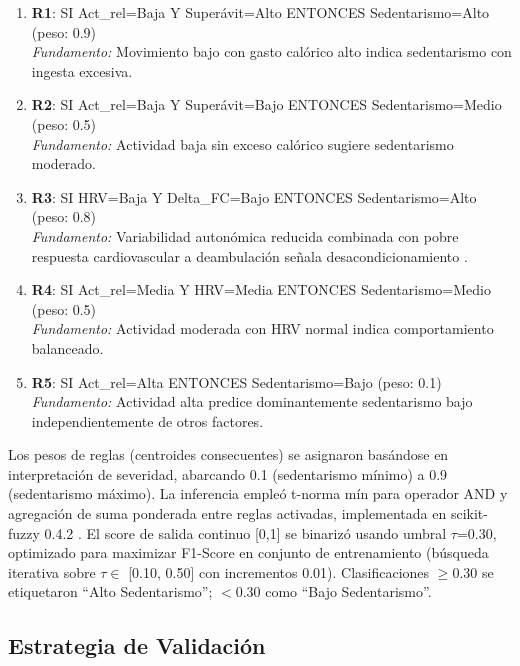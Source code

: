 \documentclass[journal,twoside,web]{ieeecolor}
\begin{document}
\begin{enumerate}
\item \textbf{R1}: SI Act\_rel=Baja Y Superávit=Alto ENTONCES Sedentarismo=Alto (peso: 0.9) \\ \textit{Fundamento:} Movimiento bajo con gasto calórico alto indica sedentarismo con ingesta excesiva.

\item \textbf{R2}: SI Act\_rel=Baja Y Superávit=Bajo ENTONCES Sedentarismo=Medio (peso: 0.5) \\ \textit{Fundamento:} Actividad baja sin exceso calórico sugiere sedentarismo moderado.

\item \textbf{R3}: SI HRV=Baja Y Delta\_FC=Bajo ENTONCES Sedentarismo=Alto (peso: 0.8) \\ \textit{Fundamento:} Variabilidad autonómica reducida combinada con pobre respuesta cardiovascular a deambulación señala desacondicionamiento \cite{Thayer2009,Shaffer2017}.

\item \textbf{R4}: SI Act\_rel=Media Y HRV=Media ENTONCES Sedentarismo=Medio (peso: 0.5) \\ \textit{Fundamento:} Actividad moderada con HRV normal indica comportamiento balanceado.

\item \textbf{R5}: SI Act\_rel=Alta ENTONCES Sedentarismo=Bajo (peso: 0.1) \\ \textit{Fundamento:} Actividad alta predice dominantemente sedentarismo bajo independientemente de otros factores.
\end{enumerate}

Los pesos de reglas (centroides consecuentes) se asignaron basándose en interpretación de severidad, abarcando 0.1 (sedentarismo mínimo) a 0.9 (sedentarismo máximo). La inferencia empleó t-norma mín para operador AND y agregación de suma ponderada entre reglas activadas, implementada en scikit-fuzzy 0.4.2 \cite{Zadeh1965}. El score de salida continuo [0,1] se binarizó usando umbral $\tau$=0.30, optimizado para maximizar F1-Score en conjunto de entrenamiento (búsqueda iterativa sobre $\tau \in$ [0.10, 0.50] con incrementos 0.01). Clasificaciones $\geq$0.30 se etiquetaron ``Alto Sedentarismo''; $<$0.30 como ``Bajo Sedentarismo''.

\subsection{Estrategia de Validación}
\label{subsec:validacion}
\end{document}
